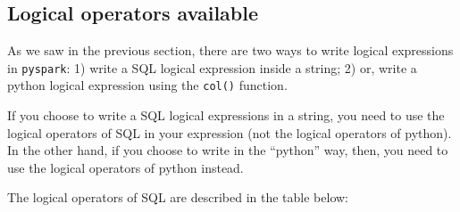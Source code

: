 \documentclass[
  11pt,
  letterpaper,
  DIV=11,
  numbers=noendperiod]{scrreprt}
\begin{document}
\hypertarget{logical-operators-available}{%
\subsection{Logical operators
available}\label{logical-operators-available}}

As we saw in the previous section, there are two ways to write logical
expressions in \texttt{pyspark}: 1) write a SQL logical expression
inside a string; 2) or, write a python logical expression using the
\texttt{col()} function.

If you choose to write a SQL logical expressions in a string, you need
to use the logical operators of SQL in your expression (not the logical
operators of python). In the other hand, if you choose to write in the
``python'' way, then, you need to use the logical operators of python
instead.

The logical operators of SQL are described in the table below:
\end{document}
